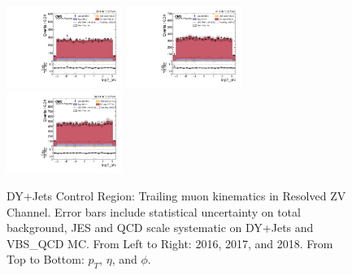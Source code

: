 \begin{figure}[!ht]
  \includegraphics[width=0.335\textwidth]{analysis_plots/2016_zjj/cr_vjets_m/lep2_phi.pdf} \hspace{-10pt}
  \includegraphics[width=0.335\textwidth]{analysis_plots/2017_zjj/cr_vjets_m/lep2_phi.pdf} \hspace{-10pt}
  \includegraphics[width=0.335\textwidth]{analysis_plots/2018_zjj/cr_vjets_m/lep2_phi.pdf} \hspace{-10pt} \\
  \caption[DY+Jets Control Region: Trailing muon kinematics in Resolved ZV Channel]%
  {DY+Jets Control Region: Trailing muon kinematics in Resolved ZV Channel.
    Error bars include statistical uncertainty on total background,
    JES and QCD scale systematic on DY+Jets and VBS\_QCD MC\@. From Left to Right: 2016,
    2017, and 2018. From Top to Bottom: \( p_T \), \( \eta \), and \( \phi \).}%
  \label{fig:zjj-cr-vjets-m-lep2-pt-eta-phi}
\end{figure}

